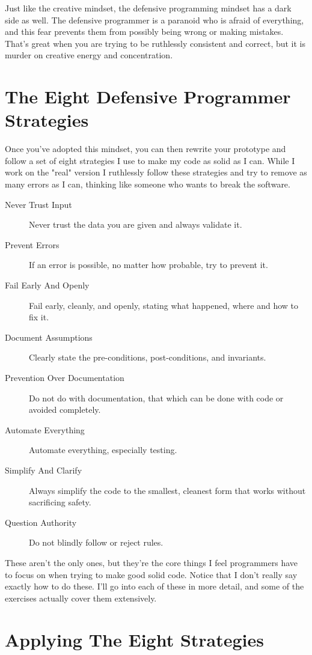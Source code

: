 Just like the creative mindset, the defensive programming mindset has a
dark side as well.  The defensive programmer is a paranoid who is afraid
of everything, and this fear prevents them from possibly being wrong or
making mistakes.  That's great when you are trying to be ruthlessly
consistent and correct, but it is murder on creative energy and 
concentration.


\section{The Eight Defensive Programmer Strategies}

Once you've adopted this mindset, you can then rewrite your prototype and follow
a set of eight strategies I use to make my code as solid as I can.  While I work
on the "real" version I ruthlessly follow these strategies and try to remove
as many errors as I can, thinking like someone who wants to break the software.


\begin{description}
\item[Never Trust Input] Never trust the data you are given and always validate it.
\item[Prevent Errors] If an error is possible, no matter how probable, try to prevent it.
\item[Fail Early And Openly] Fail early, cleanly, and openly, stating what happened, where and how to fix it.
\item[Document Assumptions] Clearly state the pre-conditions, post-conditions, and invariants.
\item[Prevention Over Documentation] Do not do with documentation, that which can be done with code or avoided completely.
\item[Automate Everything] Automate everything, especially testing.
\item[Simplify And Clarify] Always simplify the code to the smallest, cleanest form that works without sacrificing safety.
\item[Question Authority] Do not blindly follow or reject rules.
\end{description}

These aren't the only ones, but they're the core things I feel programmers have
to focus on when trying to make good solid code.  Notice that I don't really
say exactly how to do these.  I'll go into each of these in more detail, and
some of the exercises actually cover them extensively.


\section{Applying The Eight Strategies}

